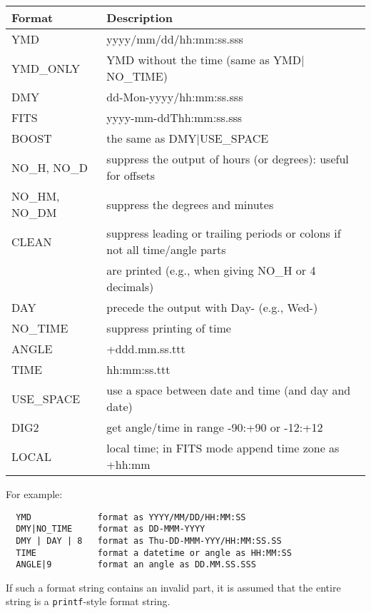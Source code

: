 \begin{itemize}
\begin{tabular}{ll}
  Format & Description \\ \hline
 YMD & yyyy/mm/dd/hh:mm:ss.sss\\
 YMD\_ONLY & YMD without the time (same as YMD$|$NO\_TIME)\\
 DMY & dd-Mon-yyyy/hh:mm:ss.sss\\
 FITS & yyyy-mm-ddThh:mm:ss.sss\\
 BOOST & the same as DMY$|$USE\_SPACE\\
 NO\_H, NO\_D & suppress
		the output of hours (or degrees): useful for offsets\\
 NO\_HM, NO\_DM &
		suppress the degrees and minutes\\
 CLEAN & suppress leading or trailing
		periods or colons if not all time/angle
                parts\\
            & are printed (e.g., when giving NO\_H or 4 decimals)\\
 DAY & precede the output with Day- (e.g., Wed-)\\
 NO\_TIME & suppress printing of time\\
 ANGLE & +ddd.mm.ss.ttt\\
 TIME & hh:mm:ss.ttt\\
 USE\_SPACE & use a space between date and time (and day and date)\\
 DIG2 & get angle/time in range -90:+90 or -12:+12\\
 LOCAL & local time; in FITS mode append time zone
  as +hh:mm\\
\end{tabular}

  For example:
\begin{verbatim}
  YMD             format as YYYY/MM/DD/HH:MM:SS
  DMY|NO_TIME     format as DD-MMM-YYYY
  DMY | DAY | 8   format as Thu-DD-MMM-YYY/HH:MM:SS.SS
  TIME            format a datetime or angle as HH:MM:SS
  ANGLE|9         format an angle as DD.MM.SS.SSS
\end{verbatim}
If such a format string contains an invalid part, it is assumed that
the entire string is a \texttt{printf}-style format string.
\end{itemize}

